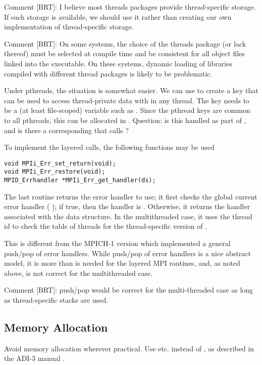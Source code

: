 \documentclass{article}
\begin{document}
Comment [BRT]: I believe most threads packages provide thread-specific
storage.  If such storage is available, we should use it rather than
creating our own implementation of thread-specific storage.

Comment [BRT]: On some systems, the choice of the threads package (or
lack thereof) must be selected at compile time and be consistent for
all object files linked into the executable.  On these systems,
dynamic loading of libraries compiled with different thread packages
is likely to be problematic.

Under pthreads, the situation is somewhat easier.  We can use
 to create a key that can be used to access
thread-private data with  in any thread.
The key needs to be a (at least file-scoped) variable such as
. 
Since the pthread keys are common to all pthreads, this can be allocated in
.  Question: is this handled as part of
, and is there a corresponding
 that calls ?

To implement the layered calls, the following functions may be 
used 
\begin{verbatim}
void MPIi_Err_set_return(void);
void MPIi_Err_restore(void);
MPID_Errhandler *MPIi_Err_get_handler(ds);
\end{verbatim}
The last routine returns the error handler to use; it first checks the
global current error handler (
); if true, then the handler is
.  Otherwise, it returns the handler
associated with the data structure.  In the multithreaded case, it
uses the thread id to check the table of threads for the
thread-specific version of .

This is different from the MPICH-1 version which implemented a general
push/pop of error handlers.  While push/pop of error handlers is a
nice abstract model, it is more than is needed for the layered MPI
routines, and, as noted above, is not correct for the multithreaded
case.

Comment [BRT]: push/pop would be correct for the multi-threaded case
as long as thread-specific stacks are used.

\subsection{Memory Allocation}
Avoid memory allocation wherever practical.  Use 
etc. instead of , as described in the ADI-3 manual
\cite{adi3man}. 
\end{document}
